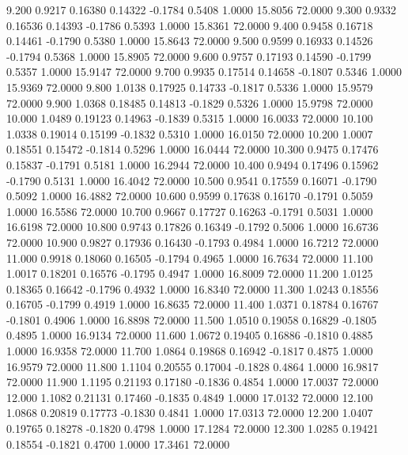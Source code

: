    9.200   0.9217   0.16380   0.14322  -0.1784   0.5408   1.0000  15.8056  72.0000
   9.300   0.9332   0.16536   0.14393  -0.1786   0.5393   1.0000  15.8361  72.0000
   9.400   0.9458   0.16718   0.14461  -0.1790   0.5380   1.0000  15.8643  72.0000
   9.500   0.9599   0.16933   0.14526  -0.1794   0.5368   1.0000  15.8905  72.0000
   9.600   0.9757   0.17193   0.14590  -0.1799   0.5357   1.0000  15.9147  72.0000
   9.700   0.9935   0.17514   0.14658  -0.1807   0.5346   1.0000  15.9369  72.0000
   9.800   1.0138   0.17925   0.14733  -0.1817   0.5336   1.0000  15.9579  72.0000
   9.900   1.0368   0.18485   0.14813  -0.1829   0.5326   1.0000  15.9798  72.0000
  10.000   1.0489   0.19123   0.14963  -0.1839   0.5315   1.0000  16.0033  72.0000
  10.100   1.0338   0.19014   0.15199  -0.1832   0.5310   1.0000  16.0150  72.0000
  10.200   1.0007   0.18551   0.15472  -0.1814   0.5296   1.0000  16.0444  72.0000
  10.300   0.9475   0.17476   0.15837  -0.1791   0.5181   1.0000  16.2944  72.0000
  10.400   0.9494   0.17496   0.15962  -0.1790   0.5131   1.0000  16.4042  72.0000
  10.500   0.9541   0.17559   0.16071  -0.1790   0.5092   1.0000  16.4882  72.0000
  10.600   0.9599   0.17638   0.16170  -0.1791   0.5059   1.0000  16.5586  72.0000
  10.700   0.9667   0.17727   0.16263  -0.1791   0.5031   1.0000  16.6198  72.0000
  10.800   0.9743   0.17826   0.16349  -0.1792   0.5006   1.0000  16.6736  72.0000
  10.900   0.9827   0.17936   0.16430  -0.1793   0.4984   1.0000  16.7212  72.0000
  11.000   0.9918   0.18060   0.16505  -0.1794   0.4965   1.0000  16.7634  72.0000
  11.100   1.0017   0.18201   0.16576  -0.1795   0.4947   1.0000  16.8009  72.0000
  11.200   1.0125   0.18365   0.16642  -0.1796   0.4932   1.0000  16.8340  72.0000
  11.300   1.0243   0.18556   0.16705  -0.1799   0.4919   1.0000  16.8635  72.0000
  11.400   1.0371   0.18784   0.16767  -0.1801   0.4906   1.0000  16.8898  72.0000
  11.500   1.0510   0.19058   0.16829  -0.1805   0.4895   1.0000  16.9134  72.0000
  11.600   1.0672   0.19405   0.16886  -0.1810   0.4885   1.0000  16.9358  72.0000
  11.700   1.0864   0.19868   0.16942  -0.1817   0.4875   1.0000  16.9579  72.0000
  11.800   1.1104   0.20555   0.17004  -0.1828   0.4864   1.0000  16.9817  72.0000
  11.900   1.1195   0.21193   0.17180  -0.1836   0.4854   1.0000  17.0037  72.0000
  12.000   1.1082   0.21131   0.17460  -0.1835   0.4849   1.0000  17.0132  72.0000
  12.100   1.0868   0.20819   0.17773  -0.1830   0.4841   1.0000  17.0313  72.0000
  12.200   1.0407   0.19765   0.18278  -0.1820   0.4798   1.0000  17.1284  72.0000
  12.300   1.0285   0.19421   0.18554  -0.1821   0.4700   1.0000  17.3461  72.0000
